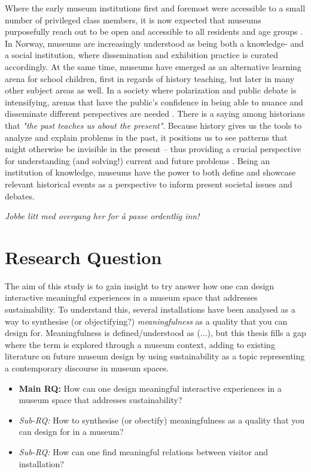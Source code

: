 Where the early museum institutions first and foremost were accessible to a small number of privileged class members, it is now expected that museums purposefully reach out to be open and accessible to all residents and age groups \autocite[p. 14]{melding23}. In Norway, museums are increasingly understood as being both a knowledge- and a social institution, where dissemination and exhibition practice is curated accordingly. At the same time, museums have emerged as an alternative learning arena for school children, first in regards of history teaching, but later in many other subject areas as well. In a society where polarization and public debate is intensifying, arenas that have the public's confidence in being able to nuance and disseminate different perspectives are needed \autocite[p. 7]{melding23}. There is a saying among historians that \emph{"the past teaches us about the present"}. Because history gives us the tools to analyze and explain problems in the past, it positions us to see patterns that might otherwise be invisible in the present – thus providing a crucial perspective for understanding (and solving!) current and future problems \autocite{UW_website}. Being an institution of knowledge, museums have the power to both define and showcase relevant historical events as a perspective to inform present societal issues and debates. 

\par
\emph{Jobbe litt med overgang her for å passe ordentlig inn!}

\section{Research Question}

The aim of this study is to gain insight to try answer how one can design interactive meaningful experiences in a museum space that addresses sustainability. To understand this, several installations have been analysed as a way to synthesise (or objectifying?) \emph{meaningfulness} as a quality that you can design for. Meaningfulness is defined/understood as (...), but this thesis fills a gap where the term is explored through a museum context, adding to existing literature on future museum design by using sustainability as a topic representing a contemporary discourse in museum spaces.

\begin{itemize}
    \item \textbf{Main RQ:} How can one design meaningful interactive experiences in a museum space that addresses sustainability?
    \item \emph{Sub-RQ:} How to synthesise (or obectify) meaningfulness as a quality that you can design for in a museum?
    \item \emph{Sub-RQ:} How can one find meaningful relations between visitor and installation?
\end{itemize}



